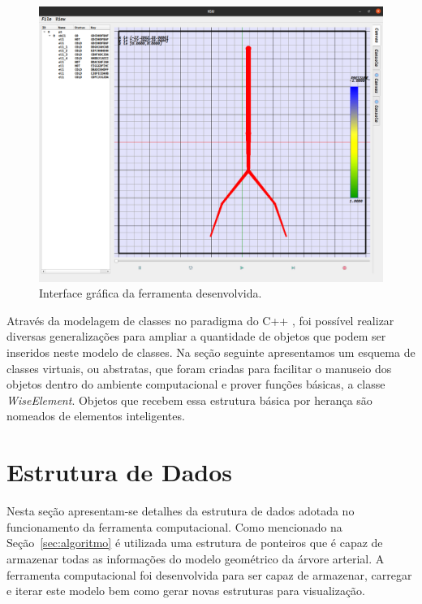 \documentclass[
        english,			
        brazil			        %
        ,<...>]{abntbibufjf}
\begin{document}
\begin{figure}[!htbp]
	\centering
	\includegraphics[scale=0.25]{Figures/IGU.png}
	\caption{Interface gráfica da ferramenta desenvolvida.}
	\label{fig1:gui}
\end{figure}

Através da modelagem de classes no paradigma do C++ \cite{AlanParker}, foi possível realizar diversas generalizações para ampliar a quantidade de objetos que podem ser inseridos neste modelo de classes. Na seção seguinte apresentamos um esquema de classes virtuais, ou abstratas, que foram criadas para facilitar o manuseio dos objetos dentro do ambiente computacional e prover funções básicas, a classe \textit{WiseElement}. Objetos que recebem essa estrutura básica por herança são nomeados de elementos inteligentes.

\section{Estrutura de Dados}\label{sec:estrutura}

Nesta seção apresentam-se detalhes da estrutura de dados adotada no funcionamento da ferramenta computacional. Como mencionado na Seção~\ref{sec:algoritmo} é utilizada uma estrutura de ponteiros que é capaz de armazenar todas as informações do modelo geométrico da árvore arterial. A ferramenta computacional foi desenvolvida para ser capaz de armazenar, carregar e iterar este modelo bem como gerar novas estruturas para visualização.
\end{document}
